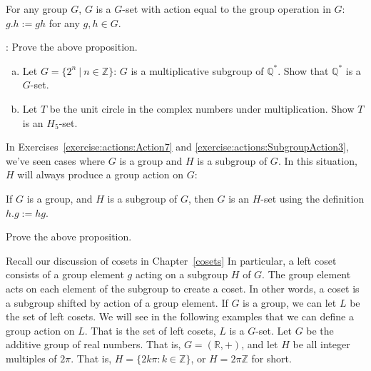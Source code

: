 \begin{prop}\label{proposition:actions:GSetSelf} 
For any group $G$, $G$ is a $G$-set with action equal to the group operation in $G$: $g.h:=gh$ for any $g,h \in G$.
\end{prop}

\begin{exercise}\label{exercise:actions:GSetSelf2}: 
Prove the above proposition.
\end{exercise}

\begin{exercise}\label{exercise:actions:SubgroupAction3}
\begin{enumerate} [(a)]
\item Let $G=\{2^n~|~n \in \mathbb{Z}\}$: $G$ is a multiplicative subgroup of $\mathbb{Q}^*$. Show that $\mathbb{Q}^*$ is a $G$-set.
\item Let $T$ be the unit circle in the complex numbers under multiplication.  Show $T$ is an $H_5$-set.
\end{enumerate}
\end{exercise}

In Exercises~\ref{exercise:actions:Action7} and \ref{exercise:actions:SubgroupAction3}, we've seen cases where $G$ is a group and $H$ is a subgroup of $G$.  In this situation, $H$ will always produce a group action on $G$:

\begin{prop}\label{proposition:actions:HSet} 
If $G$ is a group, and $H$ is a subgroup of $G$, then $G$ is an $H$-set using the definition $h.g:=hg$.
\end{prop}

\begin{exercise}\label{exercise:actions:HSet2} 
Prove the above proposition.
\end{exercise}

Recall our discussion of cosets in Chapter~\ref{cosets} In particular, a left coset consists of a group element $g$ acting on a subgroup $H$ of $G$. The group element acts on each element of the subgroup to create a coset. In other words, a coset is a subgroup shifted by action of a group element.  If $G$ is a group, we can let $L$ be the set of left cosets. We will see in the following examples that we can define a group action on $L$.  That is the set of left cosets, $L$ is a $G$-set.
Let $G$ be the additive group of real numbers.  That is, $G=(\mathbb{R},+)$, and let $H$ be all integer multiples of $2\pi$.   That is, $H=\{2k\pi:k\in \mathbb{Z}\}$, or $H = 2 \pi \mathbb{Z}$ for short.  

